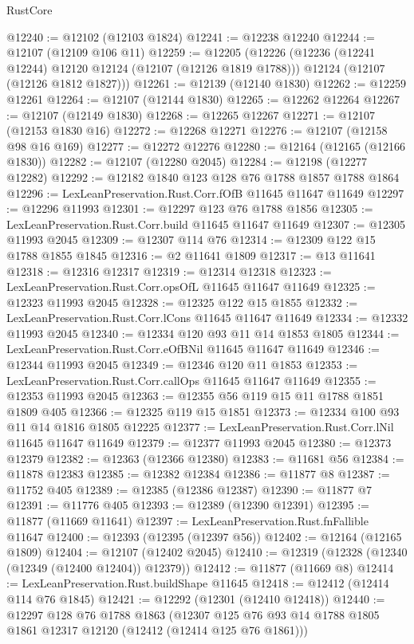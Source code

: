 \begin{lexlean}{RustCore}
\begin{coremodule}
@12240 := @12102 (@12103 @1824)
@12241 := @12238 @12240
@12244 := @12107 (@12109 @106 @11)
@12259 := @12205
    (@12226
      (@12236 (@12241 @12244) @12120 @12124 (@12107 (@12126 @1819 @1788)))
      @12124
      (@12107 (@12126 @1812 @1827)))
@12261 := @12139 (@12140 @1830)
@12262 := @12259 @12261
@12264 := @12107 (@12144 @1830)
@12265 := @12262 @12264
@12267 := @12107 (@12149 @1830)
@12268 := @12265 @12267
@12271 := @12107 (@12153 @1830 @16)
@12272 := @12268 @12271
@12276 := @12107 (@12158 @98 @16 @169)
@12277 := @12272 @12276
@12280 := @12164 (@12165 (@12166 @1830))
@12282 := @12107 (@12280 @2045)
@12284 := @12198 (@12277 @12282)
@12292 := @12182 @1840 @123 @128 @76 @1788 @1857 @1788 @1864
@12296 := LexLeanPreservation.Rust.Corr.fOfB @11645 @11647 @11649
@12297 := @12296 @11993
@12301 := @12297 @123 @76 @1788 @1856
@12305 := LexLeanPreservation.Rust.Corr.build @11645 @11647 @11649
@12307 := @12305 @11993 @2045
@12309 := @12307 @114 @76
@12314 := @12309 @122 @15 @1788 @1855 @1845
@12316 := @2 @11641 @1809
@12317 := @13 @11641
@12318 := @12316 @12317
@12319 := @12314 @12318
@12323 := LexLeanPreservation.Rust.Corr.opsOfL @11645 @11647 @11649
@12325 := @12323 @11993 @2045
@12328 := @12325 @122 @15 @1855
@12332 := LexLeanPreservation.Rust.Corr.lCons @11645 @11647 @11649
@12334 := @12332 @11993 @2045
@12340 := @12334 @120 @93 @11 @14 @1853 @1805
@12344 := LexLeanPreservation.Rust.Corr.eOfBNil @11645 @11647 @11649
@12346 := @12344 @11993 @2045
@12349 := @12346 @120 @11 @1853
@12353 := LexLeanPreservation.Rust.Corr.callOps @11645 @11647 @11649
@12355 := @12353 @11993 @2045
@12363 := @12355 @56 @119 @15 @11 @1788 @1851 @1809 @405
@12366 := @12325 @119 @15 @1851
@12373 := @12334 @100 @93 @11 @14 @1816 @1805 @12225
@12377 := LexLeanPreservation.Rust.Corr.lNil @11645 @11647 @11649
@12379 := @12377 @11993 @2045
@12380 := @12373 @12379
@12382 := @12363 (@12366 @12380)
@12383 := @11681 @56
@12384 := @11878 @12383
@12385 := @12382 @12384
@12386 := @11877 @8
@12387 := @11752 @405
@12389 := @12385 (@12386 @12387)
@12390 := @11877 @7
@12391 := @11776 @405
@12393 := @12389 (@12390 @12391)
@12395 := @11877 (@11669 @11641)
@12397 := LexLeanPreservation.Rust.fnFallible @11647
@12400 := @12393 (@12395 (@12397 @56))
@12402 := @12164 (@12165 @1809)
@12404 := @12107 (@12402 @2045)
@12410 := @12319 (@12328 (@12340 (@12349 (@12400 @12404)) @12379))
@12412 := @11877 (@11669 @8)
@12414 := LexLeanPreservation.Rust.buildShape @11645
@12418 := @12412 (@12414 @114 @76 @1845)
@12421 := @12292 (@12301 (@12410 @12418))
@12440 := @12297
    @128
    @76
    @1788
    @1863
    (@12307 @125 @76 @93 @14 @1788 @1805 @1861 @12317 @12120 (@12412 (@12414 @125 @76 @1861)))

\end{coremodule}
\end{lexlean}
